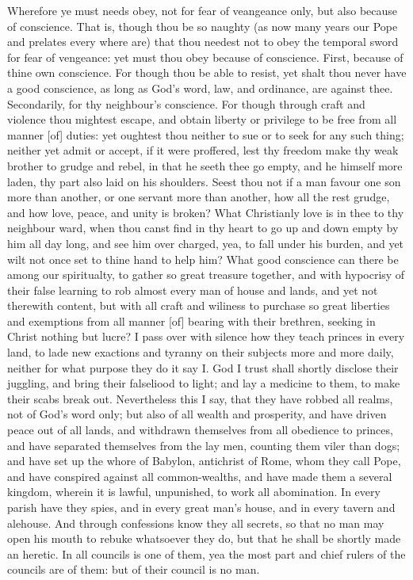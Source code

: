 Wherefore ye must needs obey, not for fear of veangeance 
only, but also because of conscience. That is, though 
thou be so naughty (as now many years our Pope and 
prelates every where are) that thou needest not to obey the 
temporal sword for fear of vengeance: yet must thou obey 
because of conscience. First, because of thine own conscience.
For though thou be able to resist, yet shalt thou 
never have a good conscience, as long as God's word, law,
and ordinance, are against thee. Secondarily, for thy 
neighbour's conscience. For though through craft and 
violence thou mightest escape, and obtain liberty or privilege
to be free from all manner [of] duties: yet oughtest 
thou neither to sue or to seek for any such thing; neither 
yet admit or accept, if it were proffered, lest thy freedom 
make thy weak brother to grudge and rebel, in that he 
seeth thee go empty, and he himself more laden, thy part 
also laid on his shoulders. Seest thou not if a man favour 
one son more than another, or one servant more than 
another, how all the rest grudge, and how love, peace, and 
unity is broken? What Christianly love is in thee to thy 
neighbour ward, when thou canst find in thy heart to go 
up and down empty by him all day long, and see him over 
charged, yea, to fall under his burden, and yet wilt not 
once set to thine hand to help him? What good conscience 
can there be among our spiritualty, to gather so great 
treasure together, and with hypocrisy of their false learning 
to rob almost every man of house and lands, and yet not 
therewith content, but with all craft and wiliness to purchase 
so great liberties and exemptions from all manner [of] bearing 
with their brethren, seeking in Christ nothing but lucre?
I pass over with silence how they teach princes in every 
land, to lade new exactions and tyranny on their subjects 
more and more daily, neither for what purpose they do it 
say I. God I trust shall shortly disclose their juggling, 
and bring their falseliood to light; and lay a medicine to 
them, to make their scabs break out. Nevertheless this I 
say, that they have robbed all realms, not of God's word 
only; but also of all wealth and prosperity, and have driven 
peace out of all lands, and withdrawn themselves from all 
obedience to princes, and have separated themselves from 
the lay men, counting them viler than dogs; and have set 
up the whore of Babylon, antichrist of Rome, whom they 
call Pope, and have conspired against all common-wealths, 
and have made them a several kingdom, wherein it is 
lawful, unpunished, to work all abomination. In every 
parish have they spies, and in every great man's house, and 
in every tavern and alehouse. And through confessions 
know they all secrets, so that no man may open his mouth 
to rebuke whatsoever they do, but that he shall be shortly 
made an heretic. In all councils is one of them, yea the 
most part and chief rulers of the councils are of them:
but of their council is no man. 


